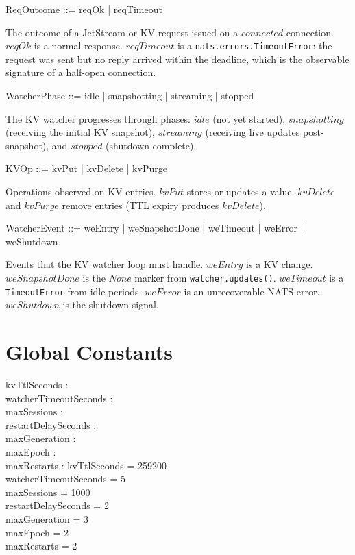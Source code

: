 \documentclass[a4paper,10pt,fleqn]{article}
\begin{document}
\begin{zed}
  ReqOutcome ::= reqOk | reqTimeout
\end{zed}

The outcome of a JetStream or KV request issued on a $connected$
connection.  $reqOk$ is a normal response.  $reqTimeout$ is a
\texttt{nats.errors.TimeoutError}: the request was sent but no
reply arrived within the deadline, which is the observable
signature of a half-open connection.

\begin{zed}
  WatcherPhase ::= idle | snapshotting | streaming | stopped
\end{zed}

The KV watcher progresses through phases: $idle$ (not yet started),
$snapshotting$ (receiving the initial KV snapshot), $streaming$
(receiving live updates post-snapshot), and $stopped$ (shutdown
complete).

\begin{zed}
  KVOp ::= kvPut | kvDelete | kvPurge
\end{zed}

Operations observed on KV entries.  $kvPut$ stores or updates a
value.  $kvDelete$ and $kvPurge$ remove entries (TTL expiry
produces $kvDelete$).

\begin{zed}
  WatcherEvent ::=
  weEntry | weSnapshotDone | weTimeout | weError | weShutdown
\end{zed}

Events that the KV watcher loop must handle.  $weEntry$ is a KV
change.  $weSnapshotDone$ is the $None$ marker from
\texttt{watcher.updates()}.  $weTimeout$ is a
\texttt{TimeoutError} from idle periods.  $weError$ is an
unrecoverable NATS error.  $weShutdown$ is the shutdown signal.

\section{Global Constants}

\begin{axdef}
  kvTtlSeconds : \nat \\
  watcherTimeoutSeconds : \nat \\
  maxSessions : \nat \\
  restartDelaySeconds : \nat \\
  maxGeneration : \nat \\
  maxEpoch : \nat \\
  maxRestarts : \nat
  \where
  kvTtlSeconds = 259200 \\
  watcherTimeoutSeconds = 5 \\
  maxSessions = 1000 \\
  restartDelaySeconds = 2 \\
  maxGeneration = 3 \\
  maxEpoch = 2 \\
  maxRestarts = 2
\end{axdef}
\end{document}
